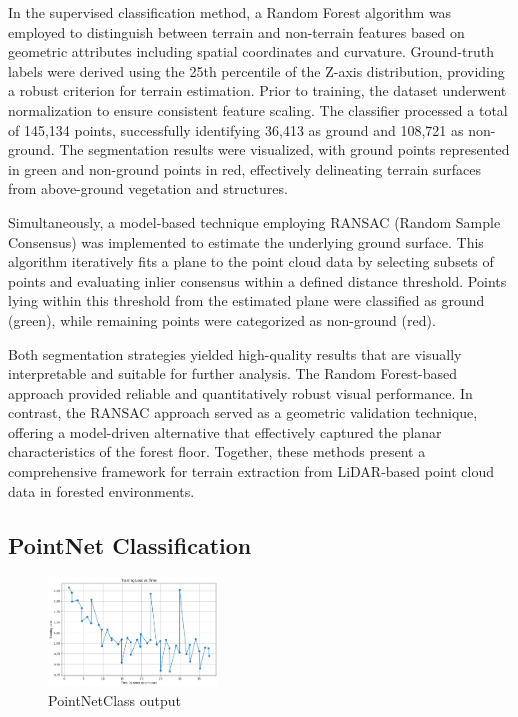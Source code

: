 \documentclass[../report.tex]{subfiles}
\begin{document}
    In the supervised classification method, a Random Forest algorithm was employed to distinguish between terrain and non-terrain features based on geometric attributes including spatial coordinates and curvature. Ground-truth labels were derived using the 25th percentile of the Z-axis distribution, providing a robust criterion for terrain estimation. Prior to training, the dataset underwent normalization to ensure consistent feature scaling. The classifier processed a total of 145,134 points, successfully identifying 36,413 as ground and 108,721 as non-ground. The segmentation results were visualized, with ground points represented in green and non-ground points in red, effectively delineating terrain surfaces from above-ground vegetation and structures.
    
    Simultaneously, a model-based technique employing RANSAC (Random Sample Consensus) was implemented to estimate the underlying ground surface. This algorithm iteratively fits a plane to the point cloud data by selecting subsets of points and evaluating inlier consensus within a defined distance threshold. Points lying within this threshold from the estimated plane were classified as ground (green), while remaining points were categorized as non-ground (red).
    
    Both segmentation strategies yielded high-quality results that are visually interpretable and suitable for further analysis. The Random Forest-based approach provided reliable and quantitatively robust visual performance. In contrast, the RANSAC approach served as a geometric validation technique, offering a model-driven alternative that effectively captured the planar characteristics of the forest floor. Together, these methods present a comprehensive framework for terrain extraction from LiDAR-based point cloud data in forested environments.
    
\subsection{PointNet Classification}
\begin{figure}[H]
    \centering
    \includegraphics[width=0.4\textwidth]{rnd-project-report-main/figures/PointNetClass.png}
    \caption{PointNetClass output}
\end{figure}
\end{document}
